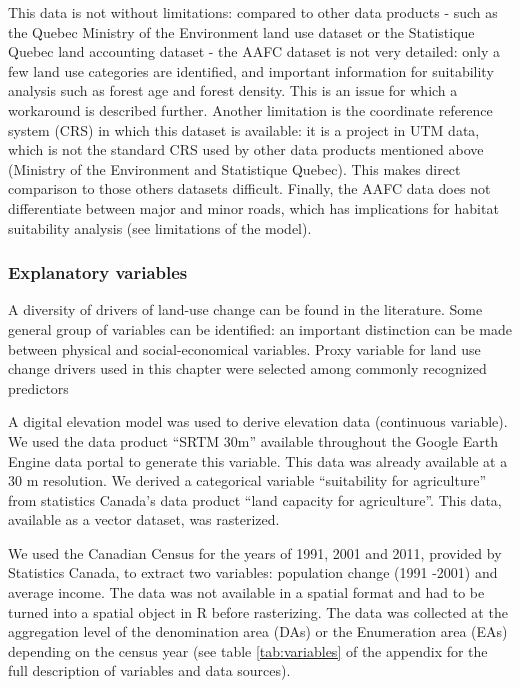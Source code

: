 This data is not without limitations: compared to other data products - such as the Quebec Ministry of the Environment land use dataset or the Statistique Quebec land accounting dataset - the AAFC dataset is not very detailed: only a few land use categories are identified, and important information for suitability analysis such as forest age and forest density. This is an issue for which a workaround is described further.  Another limitation is the coordinate reference system (CRS) in which this dataset is available: it is a project in UTM data, which is not the standard CRS used by other data products mentioned above (Ministry of the Environment and Statistique Quebec). This makes direct comparison to those others datasets difficult. Finally, the AAFC data does not differentiate between major and minor roads, which has implications for habitat suitability analysis (see limitations of the model).\\

\subsubsection*{Explanatory variables}
A diversity of drivers of land-use change can be found in the literature. Some general group of variables can be identified: an important distinction can be made between physical and social-economical variables. Proxy variable for land use change drivers used in this chapter were selected among commonly recognized predictors

A digital elevation model was used to derive elevation data (continuous variable). We used the data product “SRTM 30m” available throughout the Google Earth Engine data portal to generate this variable. This data was already available at a 30 m resolution. We derived a categorical variable “suitability for agriculture” from statistics Canada’s data product “land capacity for agriculture”. This data, available as a vector dataset, was rasterized.

We used the Canadian Census for the years of 1991, 2001 and 2011, provided by Statistics Canada, to extract two variables: population change (1991 -2001) and average income. The data was not available in a spatial format and had to be turned into a spatial object in R before rasterizing. The data was collected at the aggregation level of the denomination area (DAs) or the Enumeration area (EAs) depending on the census year (see table \ref{tab:variables} of the appendix for the full description of variables and data sources).\\

